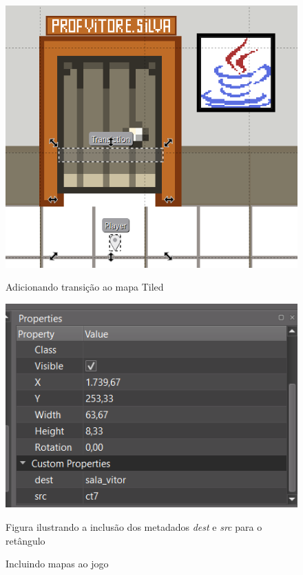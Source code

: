 \begin{figure}[h!]
    \centering
    \begin{minipage}{0.45\textwidth}
        \centering
        \includegraphics[width=\textwidth]{figuras/map-transiction.png} %
        \caption{Adicionando transição ao mapa Tiled}
        \label{fig:map-transiction}
    \end{minipage}\hfill
    \begin{minipage}{0.45\textwidth}
        \centering
        \includegraphics[width=\textwidth]{figuras/transition-properties.png} %
        \caption{Figura ilustrando a inclusão dos metadados \textit{dest} e \textit{src} para o retângulo}
        \label{fig:transiction-properties}
    \end{minipage}
    \caption{Incluindo mapas ao jogo}
    \label{fig:side_by_side}
\end{figure}

